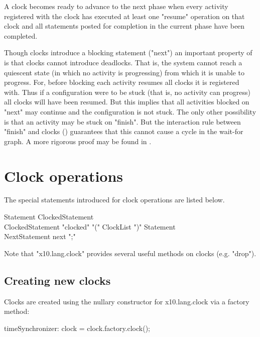 A clock becomes ready to advance to the next phase when every activity
registered with the clock has executed at least one \xcd"resume"
operation on that clock and all statements posted for completion in
the current phase have been completed.

Though clocks introduce a blocking statement (\xcd"next") an important
property of \Xten{} is that clocks cannot introduce deadlocks. That
is, the system cannot reach a quiescent state (in which no activity is
progressing) from which it is unable to progress. For, before blocking
each activity resumes all clocks it is registered with. Thus if a
configuration were to be stuck (that is, no activity can progress) all
clocks will have been resumed. But this implies that all activities
blocked on \xcd"next" may continue and the configuration is not stuck.
The only other possibility is that an activity may be stuck on
\xcd"finish". But the interaction rule between \xcd"finish" and clocks
() guarantees that this cannot cause a cycle
in the wait-for graph. A more rigorous proof may be found in \cite{X10-concur05}.

\section{Clock operations}\label{sec:clock}
The special statements introduced for clock operations are listed below.

\begin{grammar}
Statement \: ClockedStatement \\
ClockedStatement \: \xcd"clocked" \xcd"(" ClockList \xcd")" Statement \\
NextStatement \: next \xcd";" \\
\end{grammar}

Note that \xcd"x10.lang.clock" provides several useful methods on
clocks (e.g. \xcd"drop").

\subsection{Creating new clocks}\label{sec:clock:create}
Clocks are created using the nullary constructor for {\cf
x10.lang.clock} via a factory method:

\begin{xten}
timeSynchronizer: clock = clock.factory.clock();
\end{xten}

